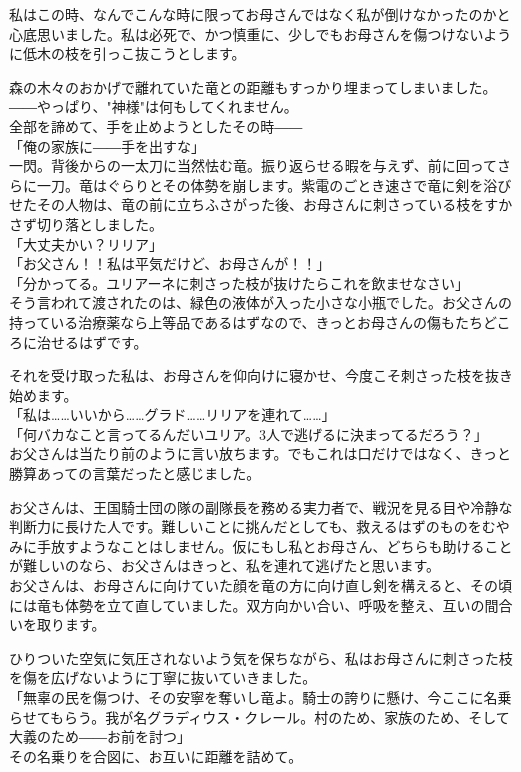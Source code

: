\documentclass[oneside, a4paper]{jsbook}
\begin{document}
私はこの時、なんでこんな時に限ってお母さんではなく私が倒けなかったのかと心底思いました。私は必死で、かつ慎重に、少しでもお母さんを傷つけないように低木の枝を引っこ抜こうとします。

森の木々のおかげで離れていた竜との距離もすっかり埋まってしまいました。\\

――やっぱり、"神様"は何もしてくれません。\\

全部を諦めて、手を止めようとしたその時――\\

\noindent
「俺の家族に――手を出すな」\\

一閃。背後からの一太刀に当然怯む竜。振り返らせる暇を与えず、前に回ってさらに一刀。竜はぐらりとその体勢を崩します。紫電のごとき速さで竜に剣を浴びせたその人物は、竜の前に立ちふさがった後、お母さんに刺さっている枝をすかさず切り落としました。\\

\noindent
「大丈夫かい？リリア」\\
「お父さん！！私は平気だけど、お母さんが！！」\\
「分かってる。ユリアーネに刺さった枝が抜けたらこれを飲ませなさい」\\

そう言われて渡されたのは、緑色の液体が入った小さな小瓶でした。お父さんの持っている治療薬なら上等品であるはずなので、きっとお母さんの傷もたちどころに治せるはずです。

それを受け取った私は、お母さんを仰向けに寝かせ、今度こそ刺さった枝を抜き始めます。\\

\noindent
「私は……いいから……グラド……リリアを連れて……」\\
「何バカなこと言ってるんだいユリア。3人で逃げるに決まってるだろう？」\\

お父さんは当たり前のように言い放ちます。でもこれは口だけではなく、きっと勝算あっての言葉だったと感じました。

お父さんは、王国騎士団の隊の副隊長を務める実力者で、戦況を見る目や冷静な判断力に長けた人です。難しいことに挑んだとしても、救えるはずのものをむやみに手放すようなことはしません。仮にもし私とお母さん、どちらも助けることが難しいのなら、お父さんはきっと、私を連れて逃げたと思います。\\

お父さんは、お母さんに向けていた顔を竜の方に向け直し剣を構えると、その頃には竜も体勢を立て直していました。双方向かい合い、呼吸を整え、互いの間合いを取ります。

ひりついた空気に気圧されないよう気を保ちながら、私はお母さんに刺さった枝を傷を広げないように丁寧に抜いていきました。\\

\noindent
「無辜の民を傷つけ、その安寧を奪いし竜よ。騎士の誇りに懸け、今ここに名乗らせてもらう。我が名グラディウス・クレール。村のため、家族のため、そして大義のため――お前を討つ」\\

その名乗りを合図に、お互いに距離を詰めて。
\end{document}
